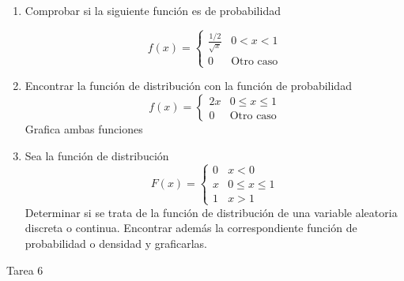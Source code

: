 \documentclass[a4paper, 12pt]{article}
\newcommand{\Pspace}{0.5cm}
\newcommand{\Aspace}{0.2cm}
\begin{document}
    \begin{enumerate}
        \item Comprobar si la siguiente función es de probabilidad \par
        \[
            f(x) =
            \begin{cases}
                \frac{1 / 2}{\sqrt{x}} & 0 < x < 1 \\
                0 & \text{Otro caso}
            \end{cases}
        \]
            \vspace{\Aspace}
            { \color{azul}  }

        \vspace{\Pspace}
        \item Encontrar la función de distribución con la función de probabilidad
        \[
            f(x) =
            \begin{cases}
                2x & 0 \leq x \leq 1 \\
                0 & \text{Otro caso}
            \end{cases}
        \]       
        Grafica ambas funciones

            \vspace{\Aspace} \par
            { \color{azul}  }


        \item Sea la función de distribución
        \[
            F(x) =
            \begin{cases}
                0 & x < 0 \\
                x & 0 \leq x \leq 1 \\
                1 & x > 1
            \end{cases}
        \]
        Determinar si se trata de la función de distribución de una variable aleatoria discreta o continua. Encontrar además la correspondiente función de probabilidad o densidad y graficarlas.
    \end{enumerate}



    \newpage
    \begin{center}
        { \LARGE Tarea 6}
    \end{center}
\end{document}
